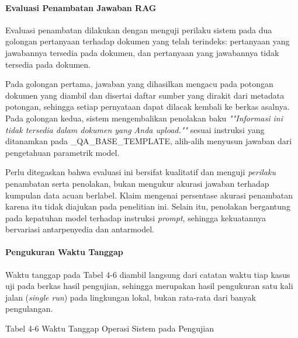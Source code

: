 \documentclass[12pt,a4paper]{article}
\begin{document}
\paragraph*{Evaluasi Penambatan Jawaban RAG}

Evaluasi penambatan dilakukan dengan menguji perilaku sistem pada dua golongan pertanyaan terhadap dokumen yang telah terindeks: pertanyaan yang jawabannya tersedia pada dokumen, dan pertanyaan yang jawabannya tidak tersedia pada dokumen.



Pada golongan pertama, jawaban yang dihasilkan mengacu pada potongan dokumen yang diambil dan disertai daftar sumber yang dirakit dari metadata potongan, sehingga setiap pernyataan dapat dilacak kembali ke berkas asalnya. Pada golongan kedua, sistem mengembalikan penolakan baku \textit{""Informasi ini tidak tersedia dalam dokumen yang Anda upload.""} sesuai instruksi yang ditanamkan pada \_QA\_BASE\_TEMPLATE, alih-alih menyusun jawaban dari pengetahuan parametrik model.



Perlu ditegaskan bahwa evaluasi ini bersifat kualitatif dan menguji \textit{perilaku} penambatan serta penolakan, bukan mengukur akurasi jawaban terhadap kumpulan data acuan berlabel. Klaim mengenai persentase akurasi penambatan karena itu tidak diajukan pada penelitian ini. Selain itu, penolakan bergantung pada kepatuhan model terhadap instruksi \textit{prompt}, sehingga kekuatannya bervariasi antarpenyedia dan antarmodel.



\paragraph*{Pengukuran Waktu Tanggap}

Waktu tanggap pada Tabel 4-6 diambil langsung dari catatan waktu tiap kasus uji pada berkas hasil pengujian, sehingga merupakan hasil pengukuran satu kali jalan (\textit{single run}) pada lingkungan lokal, bukan rata-rata dari banyak pengulangan.



Tabel 4-6	Waktu Tanggap Operasi Sistem pada Pengujian
\end{document}
